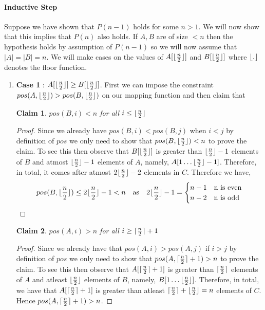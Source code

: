 \documentclass[answers]{exam}
\newtheorem{claim}{Claim}
\begin{document}
\begin{questions}
\begin{solution}
\paragraph{Inductive Step} Suppose we have shown that $P(n-1)$ holds for some $n > 1$. We will now show that this implies that $P(n)$ also holds. If $A,B$ are of size $< n$ then the hypothesis holds by assumption of $P(n-1)$ so we will now assume that $|A| = |B| = n$. We will make cases on the values of $A[\lfloor\frac{n}{2}\rfloor]$ and $B[\lfloor\frac{n}{2}\rfloor]$ where $\lfloor.\rfloor$ denotes the floor function.
\begin{enumerate}
    \item \textbf{Case 1} : $A[\lfloor\frac{n}{2}\rfloor] \geq B[\lfloor\frac{n}{2}\rfloor]$. First we can impose the constraint $pos(A, \lfloor\frac{n}{2}\rfloor) > pos(B, \lfloor\frac{n}{2}\rfloor)$ on our mapping function and then claim that
    \begin{claim}
    $pos (B, i) < n$ for all $i \leq \lfloor\frac{n}{2}\rfloor$
    \end{claim}
    \begin{proof}
    Since we already have $pos (B, i) < pos(B, j)$ when $i < j$ by definition of $pos$ we only need to show that $pos (B, \lfloor\frac{n}{2}\rfloor) < n$ to prove the claim. To see this then observe that $B[\lfloor\frac{n}{2}\rfloor]$ is greater than $\lfloor\frac{n}{2}\rfloor-1$ elements of $B$ and atmost $\lfloor\frac{n}{2}\rfloor - 1$ elements of $A$, namely, $A[1 \ldots \lfloor\frac{n}{2}\rfloor-1]$. Therefore, in total, it comes after atmost $2 \lfloor\frac{n}{2}\rfloor - 2$ elements in $C$. Therefore we have,
    \[
        pos(B, \lfloor\frac{n}{2}\rfloor) \leq 2 \lfloor\frac{n}{2}\rfloor - 1 < n \quad \text{as} \quad 2 \lfloor\frac{n}{2}\rfloor - 1 =
        \begin{cases}
            n - 1 & \text{n is even}\\
            n - 2 & \text{n is odd}
        \end{cases}
    \]
    \end{proof}
    \begin{claim}
    $pos(A, i) > n$ for all $i \geq \lceil\frac{n}{2}\rceil + 1$
    \end{claim}
    \begin{proof}
    Since we already have that $pos(A, i) > pos(A, j)$ if $i > j$ by definition of $pos$ we only need to show that $pos (A, \lceil\frac{n}{2}\rceil + 1) > n$ to prove the claim. To see this then observe that $A[\lceil\frac{n}{2}\rceil+1]$ is greater than $\lceil\frac{n}{2}\rceil$ elements of $A$ and atleast $\lfloor\frac{n}{2}\rfloor$ elements of $B$, namely, $B[1 \ldots \lfloor\frac{n}{2}\rfloor]$. Therefore, in total, we have that $A[\lceil\frac{n}{2}\rceil+1]$ is greater than atleast $\lceil\frac{n}{2}\rceil + \lfloor\frac{n}{2}\rfloor = n$ elements of $C$. Hence $pos(A, \lceil\frac{n}{2}\rceil+1) > n$.
    \end{proof}
    

\end{enumerate}
\end{solution}
\end{questions}
\end{document}
